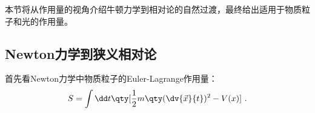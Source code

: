 
本节将从作用量的视角介绍牛顿力学到相对论的自然过渡，最终给出适用于物质粒子和光的作用量。
\subsection{Newton力学到狭义相对论}
首先看Newton力学中物质粒子的Euler-Lagrange作用量：
\begin{equation}
S=\int\dd t\qty[\frac{1}{2}m\qty(\dv{\vec x}{t})^2-V(x)]~.
\end{equation}
